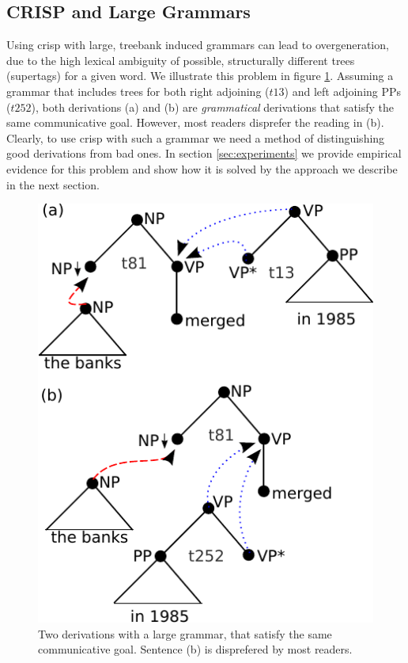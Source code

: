\subsection{CRISP and Large Grammars}
Using {\sc crisp} with large, treebank induced grammars can lead to overgeneration, 
due to the high lexical ambiguity of possible, structurally different trees (supertags) for a given word. We illustrate this problem in figure \ref{fig:overgen}. Assuming a grammar that includes trees for both right adjoining ($t13$) and left adjoining PPs ($t252$), both derivations (a) and (b) are {\it grammatical} derivations that satisfy the same communicative goal. However, most readers disprefer the reading in (b). 
Clearly, to use {\sc crisp} with such a grammar we need a method of distinguishing good derivations from bad ones. In section \ref{sec:experiments} we provide empirical evidence for this problem and show how it is solved by the approach we describe in the next section. 
\begin{figure}
\begin{center}
\includegraphics[width=.3\textwidth]{figures/overgen.pdf}
\caption{\label{fig:overgen} Two derivations with a large grammar, that satisfy the same communicative goal. Sentence (b) is disprefered by most readers.}
\end{center}
\end{figure} 

